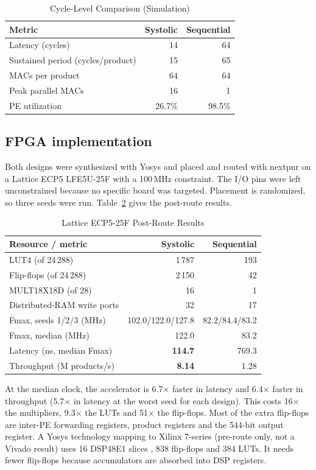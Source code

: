 \documentclass[conference]{IEEEtran}
\begin{document}
\begin{table}[t]
\caption{Cycle-Level Comparison (Simulation)}
\label{tab:cyc}
\centering\footnotesize
\begin{tabular}{@{}lrr@{}}
\toprule
Metric & Systolic & Sequential \\ \midrule
Latency (cycles) & 14 & 64 \\
Sustained period (cycles/product) & 15 & 65 \\
MACs per product & 64 & 64 \\
Peak parallel MACs & 16 & 1 \\
PE utilization & 26.7\% & 98.5\% \\ \bottomrule
\end{tabular}
\end{table}

\subsection{FPGA implementation}
Both designs were synthesized with Yosys \cite{yosys} and placed and routed with nextpnr \cite{shah2019} on a Lattice ECP5 LFE5U-25F \cite{ecp5ds} with a 100\,MHz constraint. The I/O pins were left unconstrained because no specific board was targeted. Placement is randomized, so three seeds were run. Table~\ref{tab:fpga} gives the post-route results.

\begin{table}[t]
\caption{Lattice ECP5-25F Post-Route Results}
\label{tab:fpga}
\centering\footnotesize
\begin{tabular}{@{}lrr@{}}
\toprule
Resource / metric & Systolic & Sequential \\ \midrule
LUT4 (of 24\,288) & 1\,787 & 193 \\
Flip-flops (of 24\,288) & 2\,150 & 42 \\
MULT18X18D (of 28) & 16 & 1 \\
Distributed-RAM write ports & 32 & 17 \\
Fmax, seeds 1/2/3 (MHz) & 102.0/122.0/127.8 & 82.2/84.4/83.2 \\
Fmax, median (MHz) & 122.0 & 83.2 \\ \midrule
Latency (ns, median Fmax) & \textbf{114.7} & 769.3 \\
Throughput (M products/s) & \textbf{8.14} & 1.28 \\ \bottomrule
\end{tabular}
\end{table}

At the median clock, the accelerator is 6.7$\times$ faster in latency and 6.4$\times$ faster in throughput (5.7$\times$ in latency at the worst seed for each design). This costs 16$\times$ the multipliers, 9.3$\times$ the LUTs and 51$\times$ the flip-flops. Most of the extra flip-flops are inter-PE forwarding registers, product registers and the 544-bit output register. A Yosys technology mapping to Xilinx 7-series (pre-route only, not a Vivado result) uses 16 DSP48E1 slices \cite{ug479}, 838 flip-flops and 384 LUTs. It needs fewer flip-flops because accumulators are absorbed into DSP registers.
\end{document}

